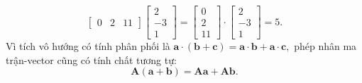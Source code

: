 \[\begin{bmatrix}
    0&2&11
\end{bmatrix}\begin{bmatrix}
    2\\-3\\1
\end{bmatrix}=\begin{bmatrix}
    0\\2\\11
\end{bmatrix}\cdot \begin{bmatrix}
    2\\-3\\1
\end{bmatrix} =5.\]
Vì tích vô hướng có tính phân phối là \(\mathbf{a}\cdot(\mathbf{b}+\mathbf{c})=\mathbf{a}\cdot\mathbf{b}+\mathbf{a}\cdot\mathbf{c},\)
phép nhân ma trận-vector cũng có tính chất tương tự: \[\mathbf{A}(\mathbf{a}+\mathbf{b})=\mathbf{A}\mathbf{a}+\mathbf{A}\mathbf{b}.\]
\vspace{8pt}

